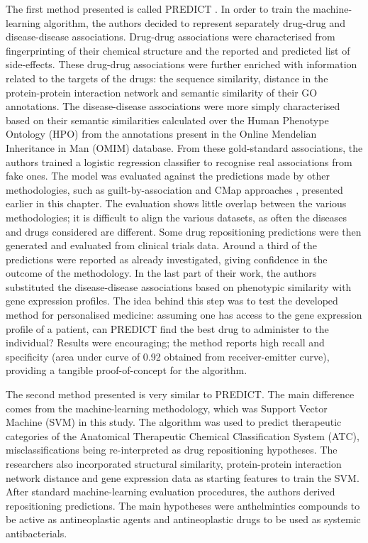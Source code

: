 The first method presented is called PREDICT \citep{gottlieb2011predict}. In order to train the machine-learning algorithm, the authors decided to represent separately drug-drug and disease-disease associations. Drug-drug associations were characterised from fingerprinting of their chemical structure and the reported and predicted list of side-effects. These drug-drug associations were further enriched with information related to the targets of the drugs: the sequence similarity, distance in the protein-protein interaction network and semantic similarity of their GO annotations. The disease-disease associations were more simply characterised based on their semantic similarities calculated over the Human Phenotype Ontology (HPO) from the annotations present in the Online Mendelian Inheritance in Man (OMIM) database. From these gold-standard associations, the authors trained a logistic regression classifier to recognise real associations from fake ones. The model was evaluated against the predictions made by other methodologies, such as guilt-by-association and CMap approaches \citep{lamb2006connectivity}, presented earlier in this chapter. The evaluation shows little overlap between the various methodologies; it is difficult to align the various datasets, as often the diseases and drugs considered are different. Some drug repositioning predictions were then generated and evaluated from clinical trials data. Around a third of the predictions were reported as already investigated, giving confidence in the outcome of the methodology. In the last part of their work, the authors substituted the disease-disease associations based on phenotypic similarity with gene expression profiles. The idea behind this step was to test the developed method for personalised medicine: assuming one has access to the gene expression profile of a patient, can PREDICT find the best drug to administer to the individual? Results were encouraging; the method reports high recall and specificity (area under curve of 0.92 obtained from receiver-emitter curve), providing a tangible proof-of-concept for the algorithm.

The second method presented \citep{napolitano2013drug} is very similar to PREDICT. The main difference comes from the machine-learning methodology, which was Support Vector Machine (SVM) in this study. The algorithm was used to predict therapeutic categories of the Anatomical Therapeutic Chemical Classification System (ATC), misclassifications being re-interpreted as drug repositioning hypotheses. The researchers also incorporated structural similarity, protein-protein interaction network distance and gene expression data as starting features to train the SVM. After standard machine-learning evaluation procedures, the authors derived repositioning predictions. The main hypotheses were anthelmintics compounds to be active as antineoplastic agents and antineoplastic drugs to be used as systemic antibacterials.

